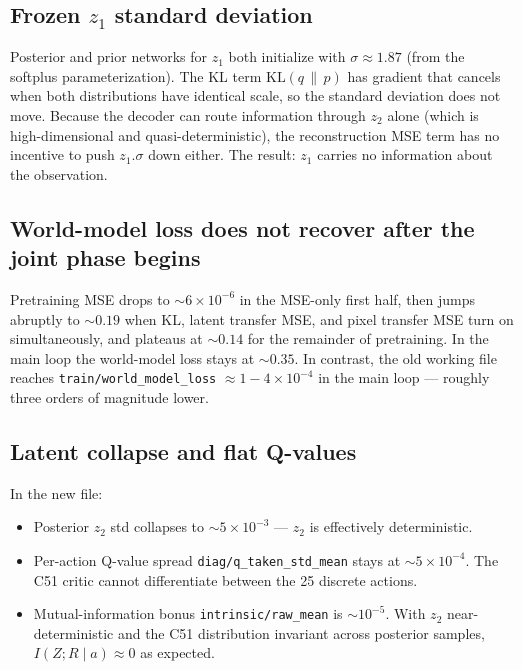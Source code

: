 \documentclass[11pt,a4paper]{article}
\begin{document}
\subsection{Frozen \texorpdfstring{$z_1$}{z1} standard deviation}

Posterior and prior networks for $z_1$ both initialize with
$\sigma \approx 1.87$ (from the softplus parameterization). The KL term
$\mathrm{KL}(q\,\|\,p)$ has gradient that cancels when both distributions have
identical scale, so the standard deviation does not move. Because the decoder
can route information through $z_2$ alone (which is high-dimensional and
quasi-deterministic), the reconstruction MSE term has no incentive to push
$z_1.\sigma$ down either. The result: $z_1$ carries no information about
the observation.

\subsection{World-model loss does not recover after the joint phase begins}

Pretraining MSE drops to $\sim 6 \times 10^{-6}$ in the MSE-only first half,
then jumps abruptly to $\sim 0.19$ when KL, latent transfer MSE, and pixel
transfer MSE turn on simultaneously, and plateaus at $\sim 0.14$ for the
remainder of pretraining. In the main loop the world-model loss stays at
$\sim 0.35$. In contrast, the old working file reaches
\texttt{train/world\_model\_loss} $\approx 1{-}4 \times 10^{-4}$ in the main
loop --- roughly three orders of magnitude lower.

\subsection{Latent collapse and flat Q-values}

In the new file:
\begin{itemize}[leftmargin=*]
  \item Posterior $z_2$ std collapses to $\sim 5 \times 10^{-3}$ --- $z_2$ is
        effectively deterministic.
  \item Per-action Q-value spread \texttt{diag/q\_taken\_std\_mean} stays at
        $\sim 5 \times 10^{-4}$. The C51 critic cannot differentiate between
        the 25 discrete actions.
  \item Mutual-information bonus \texttt{intrinsic/raw\_mean} is
        $\sim 10^{-5}$. With $z_2$ near-deterministic and the C51 distribution
        invariant across posterior samples, $I(Z;R\mid a) \approx 0$ as
        expected.
\end{itemize}
\end{document}
